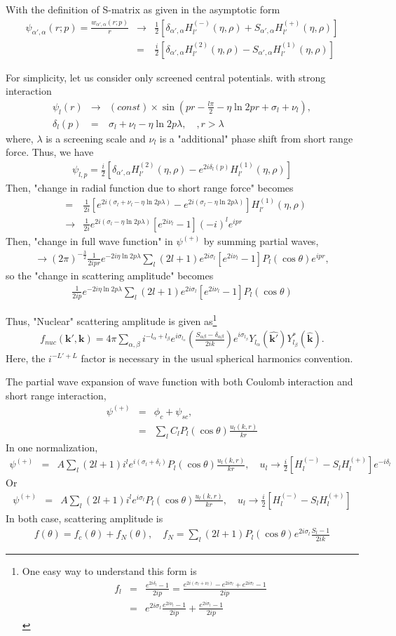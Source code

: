 \documentclass[10pt]{book}
\def\bm{\boldsymbol}
\newcommand{\bea}{\begin{eqnarray}}
\newcommand{\eea}{\end{eqnarray}}
\newcommand{\no}{\nonumber \\}
\def\vk{{\bm k}}
\begin{document}
With the definition of S-matrix as given in the
asymptotic form
\bea
\psi_{\alpha',\alpha}(r;p)=\frac{w_{\alpha',\alpha}(r;p)}{r}
&\to& \frac{1}{2}[\delta_{\alpha',\alpha}H_{l'}^{(-)}(\eta,\rho)
           +S_{\alpha',\alpha} H_{l'}^{(+)}(\eta,\rho)]\no
&=&\frac{i}{2}[\delta_{\alpha',\alpha}H_{l'}^{(2)}(\eta,\rho)
           -S_{\alpha',\alpha} H_{l'}^{(1)}(\eta,\rho)]
\eea

For simplicity, let us consider only screened central potentials.
with strong interaction
\bea
\psi_{l}(r)&\to& (const)\times\sin(pr-\frac{l\pi}{2}-\eta\ln 2 p r
                            +\sigma_l+\nu_l),\no
 \delta_l(p)&=&\sigma_l+\nu_l-\eta\ln 2 p \lambda,\quad, r>\lambda
\eea
where, $\lambda$ is a screening scale 
and $\nu_l$ is a "additional"
phase shift from short range force.
Thus, we have
\bea
\psi_{l,p}=\frac{i}{2}[\delta_{\alpha',\alpha}H_{l'}^{(2)}(\eta,\rho)
           -e^{2i\delta_l(p)} H_{l'}^{(1)}(\eta,\rho)]
\eea
Then, "change in radial function due to short range force"
becomes
\bea
&=&\frac{1}{2i}[e^{2i(\sigma_l+\nu_l-\eta \ln 2p\lambda)}
             -e^{2i(\sigma_l-\eta \ln 2p\lambda)}]H_{l'}^{(1)}(\eta,\rho)
             \no
&\to&\frac{1}{2i}e^{2i(\sigma_l-\eta\ln 2p\lambda)}
     [e^{2i\nu_l}-1](-i)^l e^{ipr}                
\eea
Then, "change in full wave function" in $\psi^{(+)}$
by summing partial waves,
\bea
\to (2\pi)^{-\frac{3}{2}}\frac{1}{2ipr}e^{-2i\eta\ln 2p\lambda}
    \sum_l(2l+1)e^{2i\sigma_l}[e^{2i\nu_l}-1]P_l(\cos\theta) e^{ipr},   
\eea
so the "change in scattering amplitude" becomes
\bea
\frac{1}{2ip}e^{-2i\eta\ln 2p\lambda}\sum_{l}(2l+1)e^{2i\sigma_l}
   [e^{2i\nu_l}-1]P_l(\cos\theta)
\eea

Thus, "Nuclear" scattering amplitude is given as\footnote{
One easy way to understand this form is 
\bea
f_l&=&\frac{e^{2i\delta_l}-1}{2ip}
 =\frac{e^{2i(\sigma_l+\nu_l)}-e^{2i\sigma_l}+e^{2i\sigma_l}-1}{2ip}
 \no
 &=&e^{2i\sigma_l}\frac{e^{2i\nu_l}-1}{2ip}
  +\frac{e^{2i\sigma_l}-1}{2ip}
\eea
}
\bea
\boxed{ 
f_{nuc}(\vk',\vk)=4\pi\sum_{\alpha,\beta} i^{-l_\alpha+l_\beta}
       e^{i\sigma_{l_\alpha}}\left(\frac{S_{\alpha\beta}-\delta_{\alpha\beta}}{2ik}\right) e^{i\sigma_{l_\beta}}  
       Y_{l_\alpha}(\hat{\vk'}) Y_{l_\beta}^*(\hat{\vk}). 
 }      
\eea
Here, the $i^{-L'+L}$ factor is necessary
in the usual spherical harmonics convention.


The partial wave expansion of wave function with both Coulomb interaction 
and short range interaction,
\bea 
\psi^{(+)}&=&\phi_c+\psi_{sc},\no 
          &=&\sum_l C_l P_l(\cos\theta)\frac{u_l(k,r)}{k r}
\eea 
In one normalization, 
\bea 
\psi^{(+)}&=&A\sum_l (2l+1) i^l e^{i(\sigma_l+\delta_l)} P_l(\cos\theta)\frac{u_l(k,r)}{k r},
\quad 
u_l\to \frac{i}{2}[H_l^{(-)}-S_l H_l^{(+)}]e^{-i\delta_l}
\eea 
Or
\bea 
\psi^{(+)}&=&A\sum_l (2l+1) i^l e^{i\sigma_l} P_l(\cos\theta)\frac{u_l(k,r)}{k r},
\quad u_l\to \frac{i}{2}[H_l^{(-)}-S_l H_l^{(+)}]
\eea 
In both case, scattering amplitude is
\bea 
f(\theta)=f_c(\theta)+f_N(\theta),
\quad f_N=\sum_{l}(2l+1)P_l(\cos\theta) e^{2i\sigma_l}\frac{S_l-1}{2ik} 
\eea 
\end{document}

